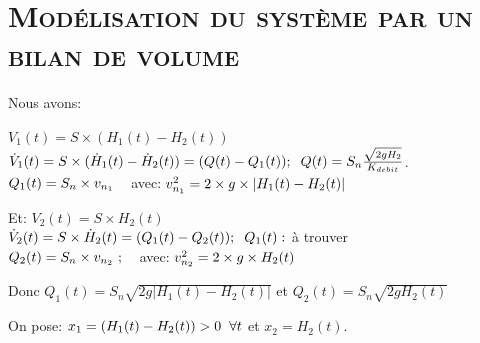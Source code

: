 \section{\textsc{Modélisation du système par un bilan de volume}}

	Nous avons:
\begin{center}

   $ V_1(t)=S\times (H_1(t)-H_2(t))$\\[0.5cm]   
    
  $\dot{V}_1(t)= S \times (\dot{H}_1(t)-\dot{H}_2(t))=(Q(t)-Q_1(t)); \hspace{2mm} Q(t) = S_n \frac{\sqrt{2gH_2}} {K_{debit}}$.\\[0.5cm]
  
    $Q_1(t)=S_n \times v_{n_1} \hspace{3mm}$ avec:$\hspace{1mm}  v^2_{n_1} = 2 \times g\times |H_1(t)-H_2(t)| \\[1 cm]$
 
 Et:
    $V_2(t)=S\times H_2(t)$\\[0.5cm]

   $ \dot{V}_2(t) = S \times \dot{H}_2(t)=(Q_1(t)-Q_2(t)); \hspace{2mm} Q_1(t):$ à trouver\\[0.5cm]
    
    $Q_2(t) = S_n \times v_{n_2} \ ; \hspace{3mm}$ avec:$\hspace{1mm}  v^2_{n_2} = 2 \times g\times H_2(t)$ \\[1 cm]
\end{center} 


Donc $Q_1(t)=S_n\sqrt{2g |H_1(t)-H_2(t)|}$ et $ Q_2(t)=S_n\sqrt{2gH_2(t)} $\\
\par On pose:  $ x_1 = (H_1(t) - H_2(t)) > 0 \hspace{2mm} \forall t$ et $ x_2 = H_2(t) $.\\[0.25 cm]

%
 

